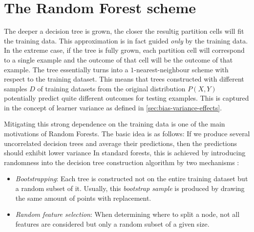 \documentclass[../main.tex]{subfiles}
\begin{document}
\section{The Random Forest scheme}
\label{sec:random-forest-scheme}


The deeper a decision tree is grown, the closer the resultig partition cells will fit the training data. This approximation is in fact guided \textit{only} by the training data. In the extreme case, if the tree is fully grown, each partition cell will correspond to a single example and the outcome of that cell will be the outcome of that example. The tree essentially turns into a $1$-nearest-neighbour scheme with respect to the training dataset. This means that trees constructed with different samples $D$ of training datasets from the original distribution $P(X,Y)$ potentially predict quite different outcomes for testing examples. This is captured in the concept of learner variance as defined in \ref{sec:bias-variance-effects}. 

Mitigating this strong dependence on the training data is one of the main motivations of Random Forests. The basic idea is as follows: If we produce several uncorrelated decision trees and average their predictions, then the predictions should exhibit lower variance
In standard forests, this is achieved by introducing randomness into the decision tree construction algorithm by two mechanisms \cite{scornet_ConsistencyRandomForests_2015,breiman_RandomForests_2001}:
\begin{itemize}
\item \textit{Bootstrapping}: Each tree is constructed not on the entire training dataset but a random subset of it. Usually, this \textit{bootstrap sample} is produced by drawing the same amount of points with replacement.
\item \textit{Random feature selection}: When determining where to split a node, not all features are considered but only a random subset of a given size.
\end{itemize}
\end{document}

